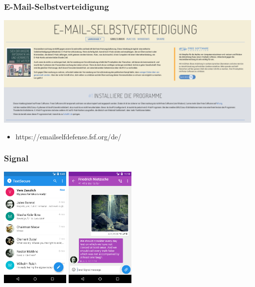 \documentclass[12pt]{beamer}
\begin{document}
\begin{frame}
\begin{center}
{    }
  \end{center}
\end{frame}

\begin{frame}
  \frametitle{E-Mail-Selbstverteidigung}
  \begin{center}
    \includegraphics[height=0.5\textheight]{img/emailselfdefense.png}
    \begin{itemize}
      \item https://emailselfdefense.fsf.org/de/
    \end{itemize}
  \end{center}
\end{frame}

\begin{frame}
  \frametitle{Signal}
    \begin{center}
      \includegraphics[height=6cm]{img/signal1.png}
      \hspace{0.5cm}
      \includegraphics[height=6cm]{img/signal2.png}
    \end{center}
\end{frame}
\end{document}
